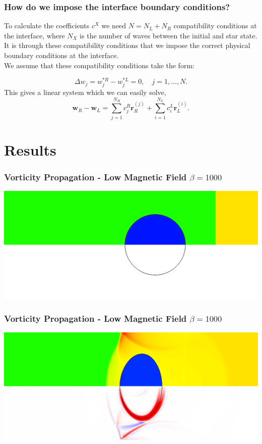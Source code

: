 \documentclass{beamer}
\begin{document}
\begin{frame}
\frametitle{How do we impose the interface boundary conditions?}
To calculate the coefficients $c^X$ we need  $N = N_L + N_R$ compatibility conditions at the interface, where $N_X$ is the number of waves between the initial and star state.\\
It is through these compatibility conditions that we impose the correct physical boundary conditions at the interface.\\
We assume that these compatibility conditions take the form:

\begin{equation}
\Delta w_j = w^{*R}_j-w^{*L}_j = 0, \quad j = 1,\dots, N.
\end{equation}
This gives a linear system which we can easily solve,
\begin{equation}
\mathbf{w}_R - \mathbf{w}_L = \sum^{N_R}_{j=1}c^R_{j}\mathbf{r}^{(j)}_R +  \sum^{N_L}_{i=1}c^L_{i}\mathbf{r}^{(i)}_L.
\end{equation}
\end{frame}

\section{Results}

\begin{frame}
\frametitle{Vorticity Propagation - Low Magnetic Field $\beta = 1000$}
\includegraphics[width=\textwidth]{../images/SRMHDBubbleBeta1000_t0_crop.png}
\end{frame}

\begin{frame}
\frametitle{Vorticity Propagation - Low Magnetic Field $\beta = 1000$}
\includegraphics[width=\textwidth]{../images/SRMHDBubbleBeta1000_t31_crop.png}
\end{frame}
\end{document}
